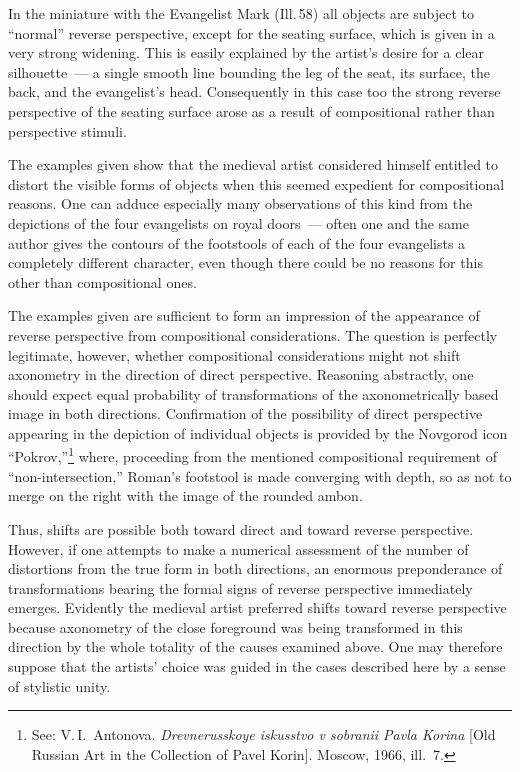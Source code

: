 In the miniature with the Evangelist Mark (Ill.\,58) all objects are subject to
``normal'' reverse perspective, except for the seating surface, which is given in a
very strong widening.  This is easily explained by the artist's desire for a clear
silhouette~--- a single smooth line bounding the leg of the seat, its surface, the
back, and the evangelist's head.  Consequently in this case too the strong reverse
perspective of the seating surface arose as a result of compositional rather than
perspective stimuli.



The examples given show that the medieval artist considered himself entitled to
distort the visible forms of objects when this seemed expedient for compositional
reasons.  One can adduce especially many observations of this kind from the
depictions of the four evangelists on royal doors~--- often one and the same author
gives the contours of the footstools of each of the four evangelists a completely
different character, even though there could be no reasons for this other than
compositional ones.

The examples given are sufficient to form an impression of the appearance of reverse
perspective from compositional considerations.  The question is perfectly legitimate,
however, whether compositional considerations might not shift axonometry in the
direction of direct perspective.  Reasoning abstractly, one should expect equal
probability of transformations of the axonometrically based image in both directions.
Confirmation of the possibility of direct perspective appearing in the depiction of
individual objects is provided by the Novgorod icon ``Pokrov,''\footnote{See:
  V.\,I.~Antonova.  \emph{Drevnerusskoye iskusstvo v sobranii Pavla Korina} [Old
  Russian Art in the Collection of Pavel Korin].  Moscow, 1966, ill.~7.}
where, proceeding from the mentioned compositional requirement of ``non-intersection,''
Roman's footstool is made converging with depth, so as not to merge on the right with
the image of the rounded ambon.

Thus, shifts are possible both toward direct and toward reverse perspective.  However,
if one attempts to make a numerical assessment of the number of distortions from the
true form in both directions, an enormous preponderance of transformations bearing the
formal signs of reverse perspective immediately emerges.  Evidently the medieval artist
preferred shifts toward reverse perspective because axonometry of the close foreground
was being transformed in this direction by the whole totality of the causes examined
above.  One may therefore suppose that the artists' choice was guided in the cases
described here by a sense of stylistic unity.

